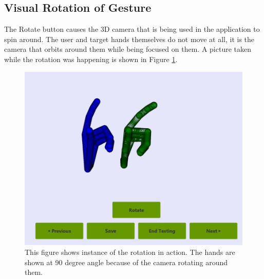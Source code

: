 \subsection{Visual Rotation of Gesture}
The Rotate button causes the 3D camera that is being used in the application to spin around. The user and target hands themselves do not move at all, it is the camera that orbits around them while being focused on them. A picture taken while the rotation was happening is shown in Figure \ref{fig:rotationButtonDemo}.
\begin{figure}[H]
\centering
\includegraphics[scale=0.35]{Figures/6_rotationButtonDemo.JPG}
\caption[Rotation Button in Action]{This figure shows instance of the rotation in action. The hands are shown at 90 degree angle because of the camera rotating around them.}
\label{fig:rotationButtonDemo}
\end{figure}

